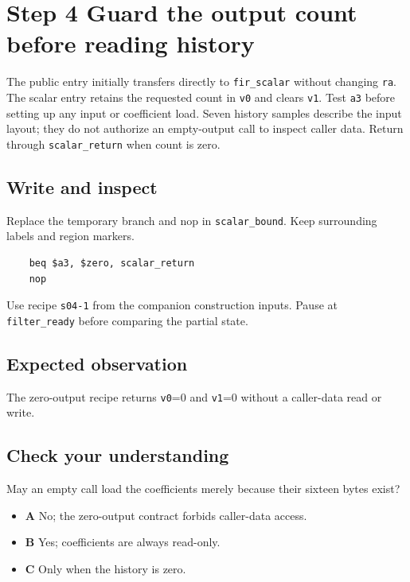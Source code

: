 \section{Step 4 Guard the output count before reading history}\label{fir-s04}

The public entry initially transfers directly to \texttt{fir\_scalar} without changing \texttt{ra}. The scalar entry retains the requested count in \texttt{v0} and clears \texttt{v1}. Test \texttt{a3} before setting up any input or coefficient load. Seven history samples describe the input layout; they do not authorize an empty-output call to inspect caller data. Return through \texttt{scalar\_return} when count is zero.

\subsection{Write and inspect}
Replace the temporary branch and nop in \texttt{scalar\_bound}. Keep surrounding labels and region markers.

\begin{verbatim}
    beq $a3, $zero, scalar_return
    nop
\end{verbatim}
Use recipe \texttt{s04-1} from the companion construction inputs. Pause at \texttt{filter\_ready} before comparing the partial state.

\subsection{Expected observation}
The zero-output recipe returns \texttt{v0}=0 and \texttt{v1}=0 without a caller-data read or write.

\subsection{Check your understanding}
May an empty call load the coefficients merely because their sixteen bytes exist?

\begin{itemize}
  \item \textbf{A} No; the zero-output contract forbids caller-data access.
  \item \textbf{B} Yes; coefficients are always read-only.
  \item \textbf{C} Only when the history is zero.
\end{itemize}
